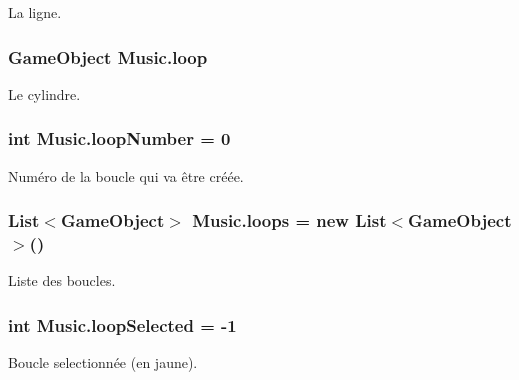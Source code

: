 La ligne. 

\hypertarget{class_music_ad8b992250bd9ff84988adc7c0091c321}{}
\subsubsection[{loop}]{\setlength{\rightskip}{0pt plus 5cm}Game\+Object Music.\+loop\hspace{0.3cm}{\ttfamily [private]}}\label{class_music_ad8b992250bd9ff84988adc7c0091c321}


Le cylindre. 

\hypertarget{class_music_a89ea80578a05f37ffefe4f83d6be0425}{}
\subsubsection[{loop\+Number}]{\setlength{\rightskip}{0pt plus 5cm}int Music.\+loop\+Number = 0\hspace{0.3cm}{\ttfamily [private]}}\label{class_music_a89ea80578a05f37ffefe4f83d6be0425}


Numéro de la boucle qui va être créée. 

\hypertarget{class_music_ac34fdcf5a15ce705117105b68a72974d}{}
\subsubsection[{loops}]{\setlength{\rightskip}{0pt plus 5cm}List$<$Game\+Object$>$ Music.\+loops = new List$<$Game\+Object$>$()}\label{class_music_ac34fdcf5a15ce705117105b68a72974d}


Liste des boucles. 

\hypertarget{class_music_a314e1e14f9b0f2fc88672df0a54ceda2}{}
\subsubsection[{loop\+Selected}]{\setlength{\rightskip}{0pt plus 5cm}int Music.\+loop\+Selected = -\/1\hspace{0.3cm}{\ttfamily [private]}}\label{class_music_a314e1e14f9b0f2fc88672df0a54ceda2}


Boucle selectionnée (en jaune). 

\hypertarget{class_music_adf436d51d0b5be109beae967b4d34522}{}
